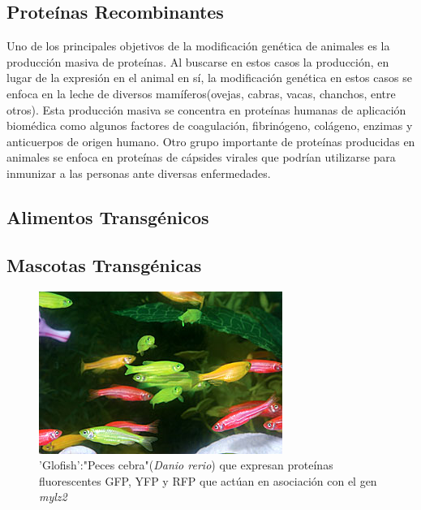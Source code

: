 \documentclass[fleqn,10pt]{SelfArx} %
\begin{document}
\subsection{Proteínas Recombinantes}

Uno de los principales objetivos de la modificación genética de animales es la producción masiva de proteínas. Al buscarse en estos casos la producción, en lugar de la expresión en el animal en sí, la modificación genética en estos casos se enfoca en la leche de diversos mamíferos(ovejas, cabras, vacas, chanchos, entre otros).  Esta producción masiva se concentra en proteínas humanas de aplicación biomédica como algunos factores de coagulación, fibrinógeno, colágeno, enzimas y anticuerpos de origen humano\cite{Koszarycz2004, niemann2007transgenic, houdebine2009production}. Otro grupo importante de proteínas producidas en animales se enfoca en proteínas de cápsides virales que podrían utilizarse para inmunizar a las personas ante diversas enfermedades\cite{Durocher15012002}.



\subsection{Alimentos Transgénicos}
  


\subsection{Mascotas Transgénicas}
    
    
  \begin{figure}[ht]\centering
\includegraphics[width=\linewidth]{images/danio}
\caption{'Glofish':"Peces cebra"(\textit{Danio rerio}) que expresan proteínas fluorescentes GFP, YFP y RFP que actúan en asociación con el gen \textit{mylz2} \cite{gong2003development}}
\end{figure}
\end{document}

